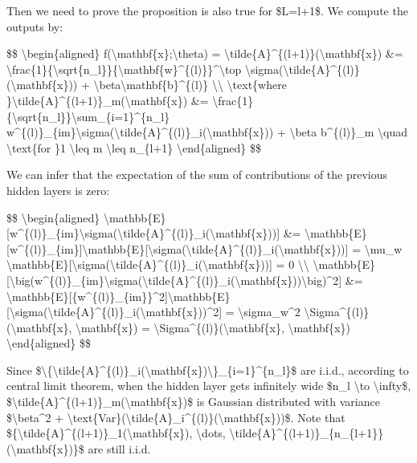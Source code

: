Then we need to prove the proposition is also true for \$L=l+1\$. We compute the outputs by:

\$\$ \textbackslash begin\{aligned\} f(\textbackslash mathbf\{x\};\textbackslash theta) = \textbackslash tilde\{A\}\^{}\{(l+1)\}(\textbackslash mathbf\{x\}) \&= \textbackslash frac\{1\}\{\textbackslash sqrt\{n\_l\}\}\{\textbackslash mathbf\{w\}\^{}\{(l)\}\}\^{}\textbackslash top \textbackslash sigma(\textbackslash tilde\{A\}\^{}\{(l)\}(\textbackslash mathbf\{x\})) + \textbackslash beta\textbackslash mathbf\{b\}\^{}\{(l)\} \textbackslash\textbackslash{} \textbackslash text\{where \}\textbackslash tilde\{A\}\^{}\{(l+1)\}\_m(\textbackslash mathbf\{x\}) \&= \textbackslash frac\{1\}\{\textbackslash sqrt\{n\_l\}\}\textbackslash sum\_\{i=1\}\^{}\{n\_l\} w\^{}\{(l)\}\_\{im\}\textbackslash sigma(\textbackslash tilde\{A\}\^{}\{(l)\}\_i(\textbackslash mathbf\{x\})) + \textbackslash beta b\^{}\{(l)\}\_m \textbackslash quad \textbackslash text\{for \}1 \textbackslash leq m \textbackslash leq n\_\{l+1\} \textbackslash end\{aligned\} \$\$

We can infer that the expectation of the sum of contributions of the previous hidden layers is zero:

\$\$ \textbackslash begin\{aligned\} \textbackslash mathbb\{E\}{[}w\^{}\{(l)\}\_\{im\}\textbackslash sigma(\textbackslash tilde\{A\}\^{}\{(l)\}\_i(\textbackslash mathbf\{x\})){]} \&= \textbackslash mathbb\{E\}{[}w\^{}\{(l)\}\_\{im\}{]}\textbackslash mathbb\{E\}{[}\textbackslash sigma(\textbackslash tilde\{A\}\^{}\{(l)\}\_i(\textbackslash mathbf\{x\})){]} = \textbackslash mu\_w \textbackslash mathbb\{E\}{[}\textbackslash sigma(\textbackslash tilde\{A\}\^{}\{(l)\}\_i(\textbackslash mathbf\{x\})){]} = 0 \textbackslash\textbackslash{} \textbackslash mathbb\{E\}{[}\textbackslash big(w\^{}\{(l)\}\_\{im\}\textbackslash sigma(\textbackslash tilde\{A\}\^{}\{(l)\}\_i(\textbackslash mathbf\{x\}))\textbackslash big)\^{}2{]} \&= \textbackslash mathbb\{E\}{[}\{w\^{}\{(l)\}\_\{im\}\}\^{}2{]}\textbackslash mathbb\{E\}{[}\textbackslash sigma(\textbackslash tilde\{A\}\^{}\{(l)\}\_i(\textbackslash mathbf\{x\}))\^{}2{]} = \textbackslash sigma\_w\^{}2 \textbackslash Sigma\^{}\{(l)\}(\textbackslash mathbf\{x\}, \textbackslash mathbf\{x\}) = \textbackslash Sigma\^{}\{(l)\}(\textbackslash mathbf\{x\}, \textbackslash mathbf\{x\}) \textbackslash end\{aligned\} \$\$

Since \$\textbackslash\{\textbackslash tilde\{A\}\^{}\{(l)\}\_i(\textbackslash mathbf\{x\})\textbackslash\}\_\{i=1\}\^{}\{n\_l\}\$ are i.i.d., according to central limit theorem, when the hidden layer gets infinitely wide \$n\_l \textbackslash to \textbackslash infty\$, \$\textbackslash tilde\{A\}\^{}\{(l+1)\}\_m(\textbackslash mathbf\{x\})\$ is Gaussian distributed with variance \$\textbackslash beta\^{}2 + \textbackslash text\{Var\}(\textbackslash tilde\{A\}\_i\^{}\{(l)\}(\textbackslash mathbf\{x\}))\$. Note that \$\{\textbackslash tilde\{A\}\^{}\{(l+1)\}\_1(\textbackslash mathbf\{x\}), \textbackslash dots, \textbackslash tilde\{A\}\^{}\{(l+1)\}\_\{n\_\{l+1\}\}(\textbackslash mathbf\{x\})\}\$ are still i.i.d.

